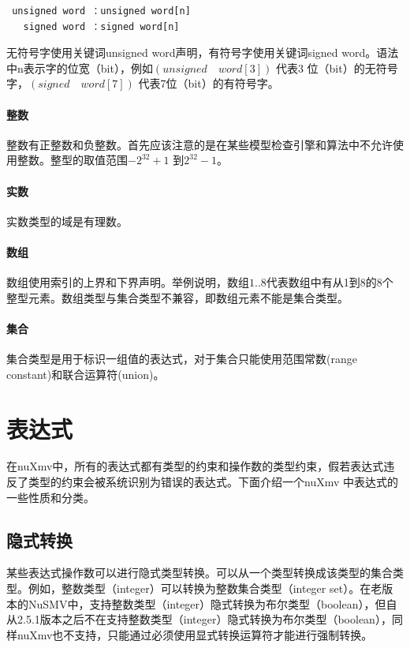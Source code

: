 \begin{lstlisting}
 unsigned word ：unsigned word[n]
   signed word ：signed word[n]
\end{lstlisting}

无符号字使用关键词unsigned word声明，有符号字使用关键词signed word。语法中n表示字的位宽（bit），例如$\left(unsigned \quad word[3]\right)$ 代表3 位（bit）的无符号字，$\left(signed \quad word[7]\right)$ 代表7位（bit）的有符号字。

\paragraph{整数}
整数有正整数和负整数。首先应该注意的是在某些模型检查引擎和算法中不允许使用整数。整型的取值范围$-2^{32}+1$ 到$2^{32}-1$。

\paragraph{实数}
实数类型的域是有理数。

\paragraph{数组}
数组使用索引的上界和下界声明。举例说明，数组$1..8$代表数组中有从1到8的8个整型元素。数组类型与集合类型不兼容，即数组元素不能是集合类型。

\paragraph{集合}
集合类型是用于标识一组值的表达式，对于集合只能使用范围常数(range constant)和联合运算符(union)。

\section{表达式}
在nuXmv中，所有的表达式都有类型的约束和操作数的类型约束，假若表达式违反了类型的约束会被系统识别为错误的表达式。下面介绍一个nuXmv 中表达式的一些性质和分类。

\subsection{隐式转换}
某些表达式操作数可以进行隐式类型转换。可以从一个类型转换成该类型的集合类型。例如，整数类型（integer）可以转换为整数集合类型（integer set）。在老版本的NuSMV中，支持整数类型（integer）隐式转换为布尔类型（boolean），但自从2.5.1版本之后不在支持整数类型（integer）隐式转换为布尔类型（boolean），同样nuXmv也不支持，只能通过必须使用显式转换运算符才能进行强制转换。


